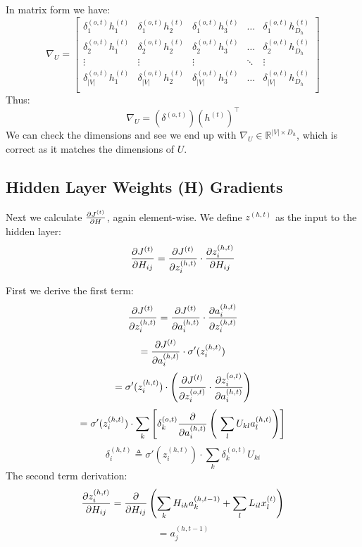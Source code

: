 \documentclass[]{article}
\newcommand{\deriv}[2]{%
	\ensuremath{\frac{\partial {#1}}{\partial {#2}}}}
\newcommand{\slayer}[3]{ %
	\ensuremath{{#1}^{(#2)}_{#3}}}
\newcommand{\vlayer}[2]{ %
	\ensuremath{{#1}^{(#2)}}}
\newcommand{\reals}[1]{ %
	\ensuremath{\in \mathbb{R}^{#1}}}
\begin{document}
In matrix form we have:
\[
\nabla_{U} = 
\begin{bmatrix}
\slayer{\delta}{o,t}{1}\slayer{h}{t}{1}       & \slayer{\delta}{o,t}{1}\slayer{h}{t}{2} & \slayer{\delta}{o,t}{1}\slayer{h}{t}{3} & \dots & \slayer{\delta}{o,t}{1}\slayer{h}{t}{D_h} \\
\slayer{\delta}{o,t}{2}\slayer{h}{t}{1}       & \slayer{\delta}{o,t}{2}\slayer{h}{t}{2} & \slayer{\delta}{o,t}{2}\slayer{h}{t}{3} & \dots & \slayer{\delta}{o,t}{2}\slayer{h}{t}{D_h} \\
\vdots	& \vdots	&\vdots	&\ddots	& \vdots \\
\slayer{\delta}{o,t}{|V|}\slayer{h}{t}{1}       & \slayer{\delta}{o,t}{|V|}\slayer{h}{t}{2} & \slayer{\delta}{o,t}{|V|}\slayer{h}{t}{3} & \dots & \slayer{\delta}{o,t}{|V|}\slayer{h}{t}{D_h} \\
\end{bmatrix}
\]
Thus:
\begin{equation} \label{eq:do,t}
\nabla_U = (\vlayer{\delta}{o,t})(\vlayer{h}{t})^\top
\end{equation}We can check the dimensions and see we end up with $\nabla_U \reals{|V| \times D_h}$, which is correct as it matches the dimensions of $U$.

\subsection{Hidden Layer Weights (H) Gradients}\label{subsection_Ht}
Next we calculate \deriv{\vlayer{J}{t}}{H}, again element-wise. We define $\vlayer{z}{h,t}$ as the input to the hidden layer:
$$\deriv{\vlayer{J}{t}}{H_{ij}} = \deriv{\vlayer{J}{t}}{\slayer{z}{h,t}{i}} \cdot \deriv{\slayer{z}{h,t}{i}}{H_{ij}}$$

First we derive the first term:
$$\deriv{\vlayer{J}{t}}{\slayer{z}{h,t}{i}} = \deriv{\vlayer{J}{t}}{\slayer{a}{h,t}{i}}\cdot\deriv{\slayer{a}{h,t}{i}}{\slayer{z}{h,t}{i}}$$
$$= \deriv{\vlayer{J}{t}}{\slayer{a}{h,t}{i}} \cdot \sigma'(\slayer{z}{h,t}{i})$$
$$= \sigma'(\slayer{z}{h,t}{i})\cdot \left(\deriv{\vlayer{J}{t}}{\slayer{z}{o,t}{i}}\cdot\deriv{\slayer{z}{o,t}{i}}{\slayer{a}{h,t}{i}}\right)$$
$$ = \sigma'(\slayer{z}{h,t}{i})\cdot \sum_k \left[\slayer{\delta}{o,t}{k} \deriv{}{\slayer{a}{h,t}{i}}\left(\ \sum_l U_{kl} \slayer{a}{h,t}{l} \right)\right]$$
$$ \slayer{\delta}{h,t}{i} \triangleq \sigma'(\slayer{z}{h,t}{i}) \cdot \sum_k \slayer{\delta}{o,t}{k} U_{ki}$$
The second term derivation:
$$\deriv{\slayer{z}{h,t}{i}}{H_{ij}} = \deriv{}{H_{ij}}\left(\sum_k H_{ik}\slayer{a}{h,t-1}{k} + \sum_l L_{il}\slayer{x}{t}{l}\right)$$
$$= \slayer{a}{h,t-1}{j}$$
\end{document}
